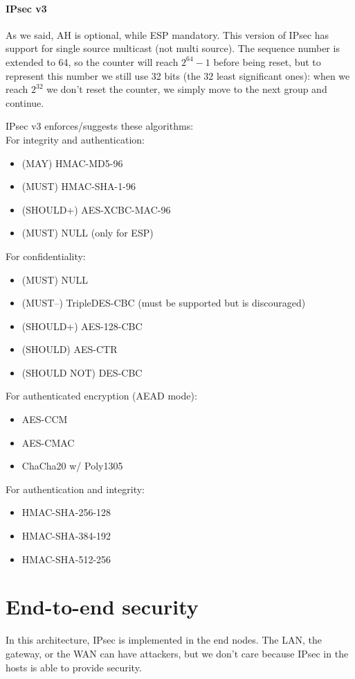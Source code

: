 \paragraph{IPsec v3}
As we said, AH is optional, while ESP mandatory. This version of IPsec has support for single source multicast (not multi source). The sequence number is extended to 64, so the counter will reach $2^{64}-1$ before being reset, but to represent this number we still use 32 bits (the 32 least significant ones): when we reach $2^{32}$ we don't reset the counter, we simply move to the next group and continue.

IPsec v3 enforces/suggests these algorithms:\\
For integrity and authentication:
\begin{itemize}
    \item (MAY) HMAC-MD5-96
    \item (MUST) HMAC-SHA-1-96
    \item (SHOULD+) AES-XCBC-MAC-96
    \item (MUST) NULL (only for ESP)
\end{itemize}
For confidentiality:
\begin{itemize}
    \item (MUST) NULL
    \item (MUST–) TripleDES-CBC (must be supported but is discouraged)
    \item (SHOULD+) AES-128-CBC
    \item (SHOULD) AES-CTR
    \item (SHOULD NOT) DES-CBC
\end{itemize}
For authenticated encryption (AEAD mode):
\begin{itemize}
    \item AES-CCM
    \item AES-CMAC
    \item ChaCha20 w/ Poly1305
\end{itemize}
For authentication and integrity:
\begin{itemize}
    \item HMAC-SHA-256-128
    \item HMAC-SHA-384-192
    \item HMAC-SHA-512-256
\end{itemize}

\section{End-to-end security}
In this architecture, IPsec is implemented in the end nodes. The LAN, the gateway, or the WAN can have attackers, but we don't care because IPsec in the hosts is able to provide security.

